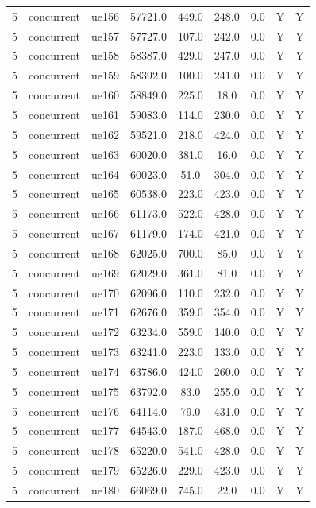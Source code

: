 \begin{table}[ht]
\begin{tabular}{|c|c|c|c|c|c|c|c|c|}
5 & concurrent & ue156 & 57721.0 & 449.0 & 248.0 & 0.0 & Y & Y \\
5 & concurrent & ue157 & 57727.0 & 107.0 & 242.0 & 0.0 & Y & Y \\
5 & concurrent & ue158 & 58387.0 & 429.0 & 247.0 & 0.0 & Y & Y \\
5 & concurrent & ue159 & 58392.0 & 100.0 & 241.0 & 0.0 & Y & Y \\
5 & concurrent & ue160 & 58849.0 & 225.0 & 18.0 & 0.0 & Y & Y \\
5 & concurrent & ue161 & 59083.0 & 114.0 & 230.0 & 0.0 & Y & Y \\
5 & concurrent & ue162 & 59521.0 & 218.0 & 424.0 & 0.0 & Y & Y \\
5 & concurrent & ue163 & 60020.0 & 381.0 & 16.0 & 0.0 & Y & Y \\
5 & concurrent & ue164 & 60023.0 & 51.0 & 304.0 & 0.0 & Y & Y \\
5 & concurrent & ue165 & 60538.0 & 223.0 & 423.0 & 0.0 & Y & Y \\
5 & concurrent & ue166 & 61173.0 & 522.0 & 428.0 & 0.0 & Y & Y \\
5 & concurrent & ue167 & 61179.0 & 174.0 & 421.0 & 0.0 & Y & Y \\
5 & concurrent & ue168 & 62025.0 & 700.0 & 85.0 & 0.0 & Y & Y \\
5 & concurrent & ue169 & 62029.0 & 361.0 & 81.0 & 0.0 & Y & Y \\
5 & concurrent & ue170 & 62096.0 & 110.0 & 232.0 & 0.0 & Y & Y \\
5 & concurrent & ue171 & 62676.0 & 359.0 & 354.0 & 0.0 & Y & Y \\
5 & concurrent & ue172 & 63234.0 & 559.0 & 140.0 & 0.0 & Y & Y \\
5 & concurrent & ue173 & 63241.0 & 223.0 & 133.0 & 0.0 & Y & Y \\
5 & concurrent & ue174 & 63786.0 & 424.0 & 260.0 & 0.0 & Y & Y \\
5 & concurrent & ue175 & 63792.0 & 83.0 & 255.0 & 0.0 & Y & Y \\
5 & concurrent & ue176 & 64114.0 & 79.0 & 431.0 & 0.0 & Y & Y \\
5 & concurrent & ue177 & 64543.0 & 187.0 & 468.0 & 0.0 & Y & Y \\
5 & concurrent & ue178 & 65220.0 & 541.0 & 428.0 & 0.0 & Y & Y \\
5 & concurrent & ue179 & 65226.0 & 229.0 & 423.0 & 0.0 & Y & Y \\
5 & concurrent & ue180 & 66069.0 & 745.0 & 22.0 & 0.0 & Y & Y \\

\end{tabular}
\end{table}
